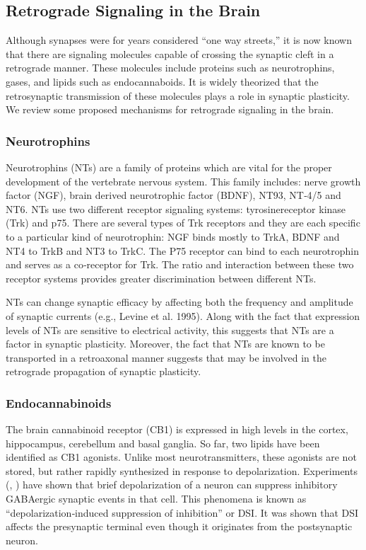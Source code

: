 \documentclass[12pt]{article}
\begin{document}
\subsection{Retrograde Signaling in the Brain}
Although synapses were for years considered ``one way streets,'' it is now known that there are signaling molecules capable of crossing the synaptic cleft in a retrograde manner. \cite{Tao2001} These molecules include proteins such as neurotrophins, \cite{Dechant2003} gases, \cite{RodriguezGrande2017} and lipids such as endocannaboids. \cite{Mechoulam1998} It is widely theorized that the retrosynaptic transmission of these molecules plays a role in synaptic plasticity. \cite{EAlger2002}\cite{Schuman1999} We review some proposed mechanisms for retrograde signaling in the brain.

\subsubsection{Neurotrophins}
Neurotrophins (NTs) are a family of proteins which are vital for the proper development of the vertebrate nervous system. \cite{Tao2001} This family includes: nerve growth factor (NGF), brain derived neurotrophic factor (BDNF), NT93, NT‐4/5 and NT6. NTs use two different receptor signaling systems: tyrosinereceptor kinase (Trk) and p75. There are several types of Trk receptors and they are each specific to a particular kind of neurotrophin: NGF binds mostly to TrkA, BDNF and NT4 to TrkB and NT3 to TrkC. The P75 receptor can bind to each neurotrophin and serves as a co‐receptor for Trk. The ratio and interaction between these two receptor systems provides greater discrimination between different NTs.

NTs can change synaptic efficacy by affecting both the frequency and amplitude of synaptic currents (e.g., Levine et al. 1995). Along with the fact that expression levels of NTs are sensitive to electrical activity, this suggests that NTs are a factor in synaptic plasticity. Moreover, the fact that NTs are known to be transported in a retroaxonal manner \cite{Hendry1974} suggests that may be involved in the retrograde propagation of synaptic plasticity.

\subsubsection{Endocannabinoids}
The brain cannabinoid receptor (CB1) is expressed in high levels in the cortex, hippocampus, cerebellum and basal ganglia. \cite{Wilson2002} So far, two lipids have been identified as CB1 agonists. Unlike most neurotransmitters, these agonists are not stored, but rather rapidly synthesized in response to depolarization. Experiments (\cite{Pitler1992}, \cite{Llano1991}) have shown that brief depolarization of a neuron can suppress inhibitory GABAergic synaptic events in that cell. This phenomena is known as ``depolarization‐induced suppression of inhibition'' or DSI. It was shown that DSI affects the presynaptic terminal even though it originates from the postsynaptic neuron.
\end{document}
